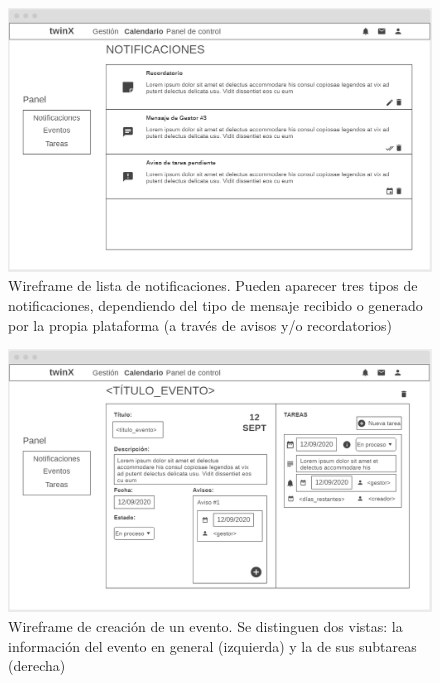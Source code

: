 \begin{figure}
	\centering
	\includegraphics[width=\textwidth]{img/Wireframes/Calendario/notificaciones_lista.png}
	\caption[Wireframe de lista de notificaciones]{Wireframe de lista de notificaciones. Pueden aparecer tres tipos de notificaciones, dependiendo del tipo de mensaje recibido o generado por la propia plataforma (a través de avisos y/o recordatorios)}
	\label{fig:notificaciones_listaWF}
\end{figure}

\begin{figure}
	\centering
	\includegraphics[width=\textwidth]{img/Wireframes/Calendario/nuevo_evento.png}
	\caption[Wireframe de creación de un evento]{Wireframe de creación de un evento. Se distinguen dos vistas: la información del evento en general (izquierda) y la de sus subtareas (derecha)}
	\label{fig:nuevo_eventoWF}
\end{figure}



